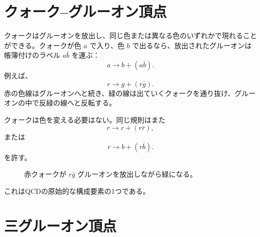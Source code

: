 \section{クォーク--グルーオン頂点}

クォークはグルーオンを放出し、同じ色または異なる色のいずれかで現れることができる。クォークが色 \(a\) で入り、色 \(b\) で出るなら、放出されたグルーオンは帳簿付けのラベル \(a\bar b\) を運ぶ：
\begin{equation}
a\longrightarrow b+(a\bar b).
\end{equation}
例えば、
\begin{equation}
r\longrightarrow g+(r\bar g).
\end{equation}
赤の色線はグルーオンへと続き、緑の線は出ていくクォークを通り抜け、グルーオンの中で反緑の線へと反転する。

クォークは色を変える必要はない。同じ規則はまた
\begin{equation}
r\longrightarrow r+(r\bar r),
\end{equation}
または
\begin{equation}
r\longrightarrow b+(r\bar b).
\end{equation}
を許す。

\begin{figure}[h]
\centering
{}
\caption{赤クォークが \(r\bar g\) グルーオンを放出しながら緑になる。}
\end{figure}

これはQCDの原始的な構成要素の1つである。

\begin{classroomqa}
\end{classroomqa}

\section{三グルーオン頂点}

